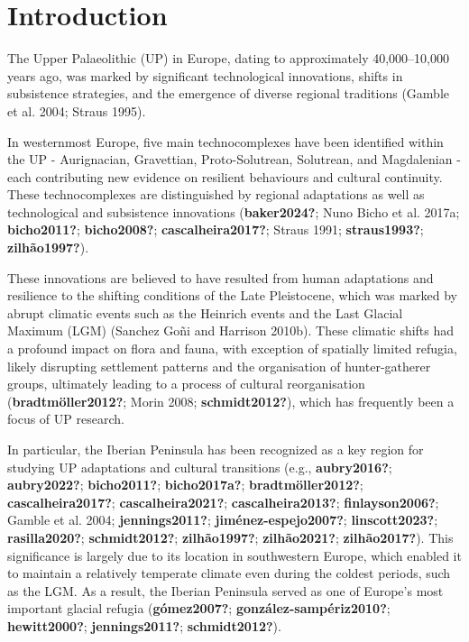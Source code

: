 \documentclass[
  a4paper,
  DIV=11,
  numbers=noendperiod]{scrreprt}
\begin{document}
\newpage

\section{Introduction}\label{introduction-3}

The Upper Palaeolithic (UP) in Europe, dating to approximately
40,000--10,000 years ago, was marked by significant technological
innovations, shifts in subsistence strategies, and the emergence of
diverse regional traditions (Gamble et al. 2004; Straus 1995).

In westernmost Europe, five main technocomplexes have been identified
within the UP - Aurignacian, Gravettian, Proto-Solutrean, Solutrean, and
Magdalenian - each contributing new evidence on resilient behaviours and
cultural continuity. These technocomplexes are distinguished by regional
adaptations as well as technological and subsistence innovations
(\textbf{baker2024?}; Nuno Bicho et al. 2017a; \textbf{bicho2011?};
\textbf{bicho2008?}; \textbf{cascalheira2017?}; Straus 1991;
\textbf{straus1993?}; \textbf{zilhão1997?}).

These innovations are believed to have resulted from human adaptations
and resilience to the shifting conditions of the Late Pleistocene, which
was marked by abrupt climatic events such as the Heinrich events and the
Last Glacial Maximum (LGM) (Sanchez Goñi and Harrison 2010b). These
climatic shifts had a profound impact on flora and fauna, with exception
of spatially limited refugia, likely disrupting settlement patterns and
the organisation of hunter-gatherer groups, ultimately leading to a
process of cultural reorganisation (\textbf{bradtmöller2012?}; Morin
2008; \textbf{schmidt2012?}), which has frequently been a focus of UP
research.

In particular, the Iberian Peninsula has been recognized as a key region
for studying UP adaptations and cultural transitions (e.g.,
\textbf{aubry2016?}; \textbf{aubry2022?}; \textbf{bicho2011?};
\textbf{bicho2017a?}; \textbf{bradtmöller2012?};
\textbf{cascalheira2017?}; \textbf{cascalheira2021?};
\textbf{cascalheira2013?}; \textbf{finlayson2006?}; Gamble et al. 2004;
\textbf{jennings2011?}; \textbf{jiménez-espejo2007?};
\textbf{linscott2023?}; \textbf{rasilla2020?}; \textbf{schmidt2012?};
\textbf{zilhão1997?}; \textbf{zilhão2021?}; \textbf{zilhão2017?}). This
significance is largely due to its location in southwestern Europe,
which enabled it to maintain a relatively temperate climate even during
the coldest periods, such as the LGM. As a result, the Iberian Peninsula
served as one of Europe's most important glacial refugia
(\textbf{gómez2007?}; \textbf{gonzález-sampériz2010?};
\textbf{hewitt2000?}; \textbf{jennings2011?}; \textbf{schmidt2012?}).
\end{document}
